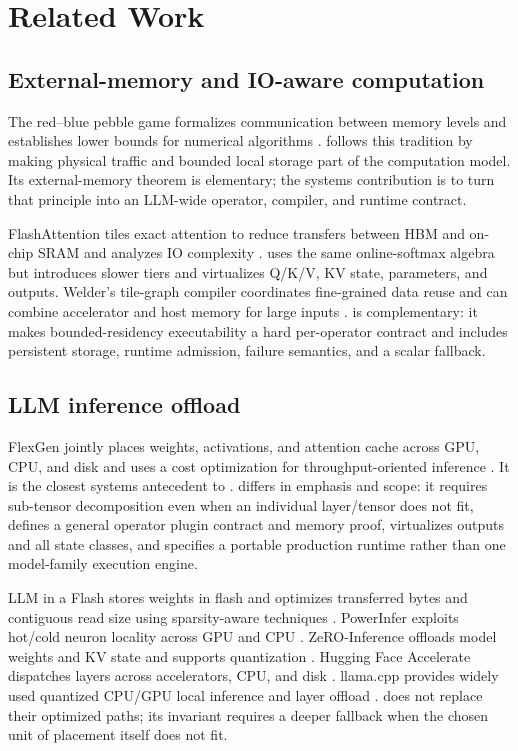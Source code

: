 \section{Related Work}
\label{sec:related}

\subsection{External-memory and IO-aware computation}

The red--blue pebble game formalizes communication between memory levels and establishes lower bounds for numerical algorithms \cite{hong1981io}. \AMS follows this tradition by making physical traffic and bounded local storage part of the computation model. Its external-memory theorem is elementary; the systems contribution is to turn that principle into an LLM-wide operator, compiler, and runtime contract.

FlashAttention tiles exact attention to reduce transfers between HBM and on-chip SRAM and analyzes IO complexity \cite{dao2022flashattention,dao2023flashattention2}. \AMS uses the same online-softmax algebra but introduces slower tiers and virtualizes Q/K/V, KV state, parameters, and outputs. Welder's tile-graph compiler coordinates fine-grained data reuse and can combine accelerator and host memory for large inputs \cite{shi2023welder}. \AMS is complementary: it makes bounded-residency executability a hard per-operator contract and includes persistent storage, runtime admission, failure semantics, and a scalar fallback.

\subsection{LLM inference offload}

FlexGen jointly places weights, activations, and attention cache across GPU, CPU, and disk and uses a cost optimization for throughput-oriented inference \cite{sheng2023flexgen}. It is the closest systems antecedent to \AMS. \AMS differs in emphasis and scope: it requires sub-tensor decomposition even when an individual layer/tensor does not fit, defines a general operator plugin contract and memory proof, virtualizes outputs and all state classes, and specifies a portable production runtime rather than one model-family execution engine.

LLM in a Flash stores weights in flash and optimizes transferred bytes and contiguous read size using sparsity-aware techniques \cite{alizadeh2023llmflash}. PowerInfer exploits hot/cold neuron locality across GPU and CPU \cite{song2023powerinfer}. ZeRO-Inference offloads model weights and KV state and supports quantization \cite{deepspeed_zero_inference}. Hugging Face Accelerate dispatches layers across accelerators, CPU, and disk \cite{accelerate_big_model}. llama.cpp provides widely used quantized CPU/GPU local inference and layer offload \cite{llamacpp}. \AMS does not replace their optimized paths; its invariant requires a deeper fallback when the chosen unit of placement itself does not fit.

